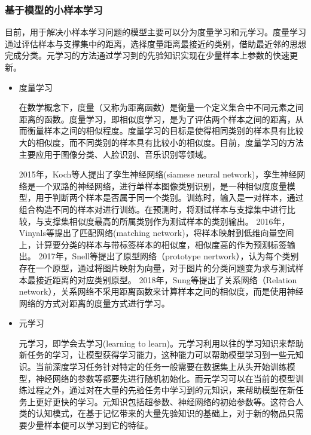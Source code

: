 \documentclass[AutoFakeBold]{LZUThesis}
\begin{document}
\subsubsection{基于模型的小样本学习}
目前，用于解决小样本学习问题的模型主要可以分为度量学习和元学习\textsuperscript{\cite{赵凯琳2021小样本学习研究综述,李新叶2020基于深度神经网络的少样本学习综述,lu2020learning}}。度量学习通过评估样本与支撑集中的距离，选择度量距离最接近的类别，借助最近邻的思想完成分类。元学习的方法通过学习到的先验知识实现在少量样本上参数的快速更新。
\begin{itemize}[topsep=5pt,listparindent=25pt]
    \item 度量学习
          \par 在数学概念下，度量（又称为距离函数）是衡量一个定义集合中不同元素之间距离的函数\textsuperscript{\cite{shen2014recent}}。度量学习，即相似度学习，是为了评估两个样本之间的距离，从而衡量样本之间的相似程度。\textsuperscript{\cite{bellet2013survey}}度量学习的目标是使得相同类别的样本具有比较大的相似度，而不同类别的样本具有比较小的相似度。目前，度量学习的方法主要应用于图像分类、人脸识别、音乐识别等领域。

          2015年，Koch等人提出了孪生神经网络(siamese neural network)\textsuperscript{\cite{koch2015siamese}}，孪生神经网络是一个双路的神经网络，进行单样本图像类别识别，是一种相似度度量模型，用于判断两个样本是否属于同一个类别。训练时，输入是一对样本，通过组合构造不同的样本对进行训练。在预测时，将测试样本与支撑集中进行比较，与支撑集相似度最高的所属类别作为测试样本的类别输出。
          2016年，Vinyals等提出了匹配网络(matching network)\textsuperscript{\cite{vinyals2016matching}}，将样本映射到低维向量空间上，计算要分类的样本与带标签样本的相似度，相似度高的作为预测标签输出。
          2017年，Snell等提出了原型网络（prototype nertwork）\textsuperscript{\cite{snell2017prototypical}}，认为每个类别存在一个原型，通过将图片映射为向量，对于图片的分类问题变为求与测试样本最接近距离的对应类别原型。
          2018年，Sung等提出了关系网络（Relation network）\textsuperscript{\cite{sung2018learning}}，关系网络不采用距离函数来计算样本之间的相似度，而是使用神经网络的方式对距离的度量方式进行学习。

    \item 元学习
          \par
          元学习，即学会去学习(learning to learn)\textsuperscript{\cite{thrun1998learning}}。元学习利用以往的学习知识来帮助新任务的学习，让模型获得学习能力，这种能力可以帮助模型学习到一些元知识。当前深度学习任务针对特定的任务一般需要在数据集上从头开始训练模型，神经网络的参数等都要先进行随机初始化。而元学习可以在当前的模型训练过程之外，通过对在大量的先验任务中学习到的元知识，来帮助模型在新任务上更好更快的学习。元知识包括超参数、神经网络的初始参数等。这符合人类的认知模式，在基于记忆带来的大量先验知识的基础上，对于新的物品只需要少量样本便可以学习到它的特征。


\end{itemize}
\end{document}
